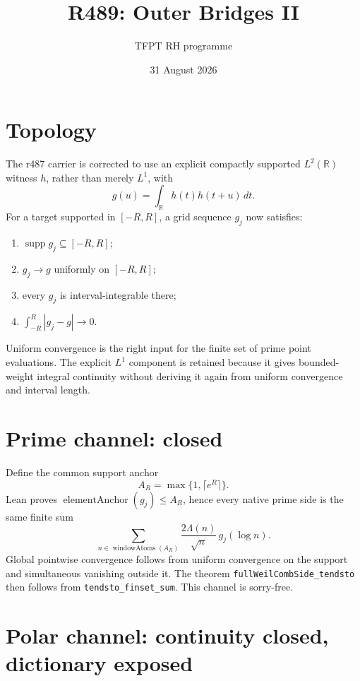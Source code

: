 \documentclass[11pt]{article}
\title{R489: Outer Bridges II}
\author{TFPT RH programme}
\date{31 August 2026}
\newcommand{\code}[1]{\nolinkurl{#1}}
\begin{document}
\maketitle

\begin{center}
\end{center}

\section{Topology}

The r487 carrier is corrected to use an explicit compactly supported
\(L^2(\mathbb R)\) witness \(h\), rather than merely \(L^1\), with
\[
 g(u)=\int_{\mathbb R}h(t)h(t+u)\,dt .
\]
For a target supported in \([-R,R]\), a grid sequence \(g_j\) now
satisfies:
\begin{enumerate}
\item \(\operatorname{supp}g_j\subseteq[-R,R]\);
\item \(g_j\to g\) uniformly on \([-R,R]\);
\item every \(g_j\) is interval-integrable there;
\item \(\int_{-R}^{R}|g_j-g|\to0\).
\end{enumerate}
Uniform convergence is the right input for the finite set of prime
point evaluations.  The explicit \(L^1\) component is retained because
it gives bounded-weight integral continuity without deriving it again
from uniform convergence and interval length.

\section{Prime channel: closed}

Define the common support anchor
\[
 A_R=\max\{1,\lceil e^R\rceil\}.
\]
Lean proves \(\operatorname{elementAnchor}(g_j)\le A_R\), hence every
native prime side is the same finite sum
\[
 \sum_{n\in\operatorname{windowAtoms}(A_R)}
       \frac{2\Lambda(n)}{\sqrt n}\,g_j(\log n).
\]
Global pointwise convergence follows from uniform convergence on the
support and simultaneous vanishing outside it.  The theorem
\code{fullWeilCombSide_tendsto} then follows from
\code{tendsto_finset_sum}.  This channel is sorry-free.

\section{Polar channel: continuity closed, dictionary exposed}
\end{document}
